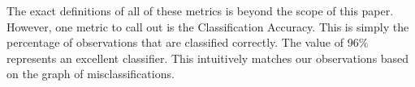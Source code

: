 \begin{flushleft}The exact definitions of all of these metrics is beyond the scope of this paper. However, one metric to call out is the Classification Accuracy. This is simply the percentage of observations that are classified correctly. The value of 96\% represents an excellent classifier. This intuitively matches our observations based on the graph of misclassifications.
\end{flushleft}





